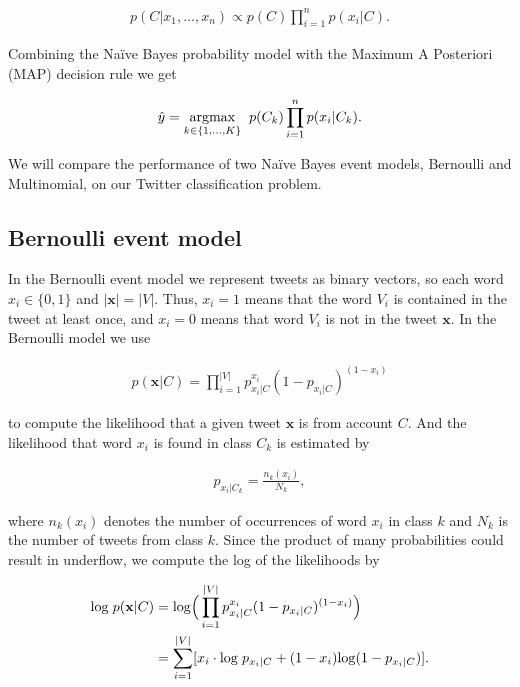 \documentclass{article}
\renewcommand{\vec}[1]{\mathbf{#1}}
\begin{document}
\begin{align}
p(C|x_1, \dots ,x_n) \propto p(C)\prod^n_{i=1} p(x_i|C).
\end{align}

\noindent
Combining the Na\"{i}ve Bayes probability model with the Maximum A Posteriori (MAP) decision rule we get

\begin{align}
\hat{y} = \underset{k \in \{1,\dots,K\}}{\rm{argmax}} \hspace{2mm} p(C_k)\prod^n_{i=1}p(x_i|C_k).
\end{align}

\noindent
We will compare the performance of two Na\"{i}ve Bayes event models, Bernoulli and Multinomial, on our Twitter classification problem.

\subsection{Bernoulli event model}

In the Bernoulli event model we represent tweets as binary vectors, so each word  $x_i \in \{0,1\}$ and $|\vec{x}| = |V|$. Thus, $x_i = 1$ means that the word $V_i$ is contained in the tweet at least once, and $x_i = 0$ means that word $V_i$ is not in the tweet $\vec{x}$. In the Bernoulli model we use

\begin{align}
p(\vec{x}|C) = \prod^{|V|}_{i=1} p_{x_i|C}^{x_i}(1-p_{x_i|C})^{(1-x_i)}
\end{align}

\noindent
to compute the likelihood that a given tweet $\vec{x}$ is from account $C$. And the likelihood that word $x_i$ is found in class $C_k$ is estimated by

\begin{align}
p_{x_i|C_k} = \frac{n_k(x_i)}{N_k},
\end{align}

\noindent
where $n_k(x_i)$ denotes the number of occurrences of word $x_i$ in class $k$ and $N_k$ is the number of tweets from class $k$. Since the product of many probabilities could result in underflow, we compute the log of the likelihoods by

\begin{align}
\mathrm{log} \hspace{1mm} p(\vec{x}|C) &= \mathrm{log}\Big(\prod^{|V|}_{i=1} p_{x_i|C}^{x_i} (1-p_{x_i|C})^{(1-x_i)}\Big) \\
                     &= \sum_{i=1}^{|V|} \lbrack x_i \cdot \mathrm{log} \hspace{1mm} p_{x_i|C} + (1-x_i)\mathrm{log}(1-p_{x_i|C}) \rbrack.
\end{align}
\end{document}
